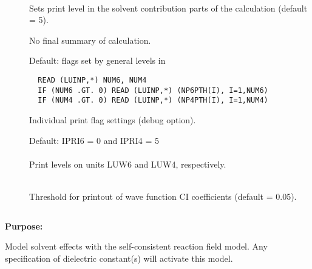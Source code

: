 \begin{description}
\item[]
   \\
  Sets print level in the solvent contribution parts of the
  calculation (default = 5).

\item[]
  No final summary of calculation.

\item[]
 Default: flags set by general levels in 
\begin{verbatim}
  READ (LUINP,*) NUM6, NUM4
  IF (NUM6 .GT. 0) READ (LUINP,*) (NP6PTH(I), I=1,NUM6)
  IF (NUM4 .GT. 0) READ (LUINP,*) (NP4PTH(I), I=1,NUM4)
\end{verbatim}
  Individual print flag settings (debug option).

\item[]
  Default: IPRI6 = 0 and IPRI4 = 5 \\
   \\
  Print levels on units LUW6 and LUW4, respectively.
%
%
\item[]
   \\
  Threshold for printout of wave function CI coefficients (default = 0.05).
 \end{description}



\pagebreak[3]
\subsection{\label{ref-solinp}}

{\bf Purpose:}

Model solvent effects with the self-consistent
reaction field model.
Any specification of dielectric constant(s)
will activate this model.

